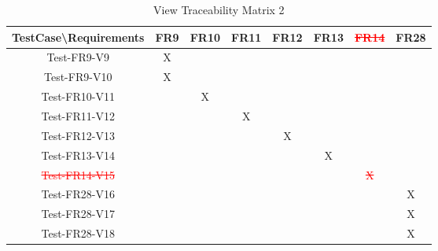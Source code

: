 \documentclass[12pt]{article}
\begin{document}
\begin{table}[htp]
\centering
\caption{View Traceability Matrix 2}
\begin{tabular}{|c|c|c|c|c|c|c|c|}
\hline
TestCase\textbackslash{}Requirements & FR9 & FR10 & FR11 & FR12 & FR13 & \textcolor{red}{\st{FR14}}   & FR28 \\ \hline
Test-FR9-V9                          & X   &      &      &      &      &      &      \\ \hline
Test-FR9-V10                         & X   &      &      &      &      &      &      \\ \hline
Test-FR10-V11                        &     & X    &      &      &      &      &      \\ \hline
Test-FR11-V12                        &     &      & X    &      &      &      &      \\ \hline
Test-FR12-V13                        &     &      &      & X    &      &      &      \\ \hline
Test-FR13-V14                        &     &      &      &      & X    &      &      \\ \hline
\textcolor{red}{\st{Test-FR14-V15}}                        &     &      &      &      &      & \textcolor{red}{\st{X}}     &      \\ \hline
Test-FR28-V16                        &     &      &      &      &      &      & X    \\ \hline
Test-FR28-V17                        &     &      &      &      &      &      & X    \\ \hline
Test-FR28-V18                        &     &      &      &      &      &      & X    \\ \hline
\end{tabular}
\end{table}
\newpage
\end{document}
